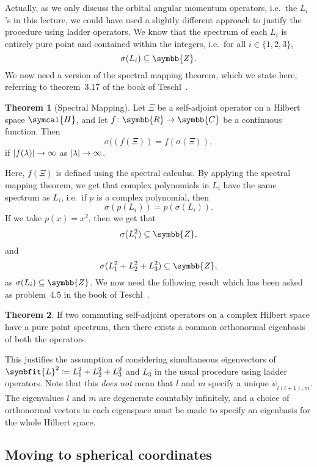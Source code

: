 \documentclass[12pt, a4 paper]{article}
\theoremstyle{definition}
\newtheorem{thm}{Theorem}
\newcommand{\rr}{\symbb{R}}
\newcommand{\cc}{\symbb{C}}
\newcommand{\zz}{\symbb{Z}}
\newcommand{\hilbert}{\symcal{H}}
\newcommand{\spec}{\sigma}
\DeclarePairedDelimiter{\abs}{\lvert}{\rvert}
\begin{document}
    Actually, as we only discuss the orbital angular momentum operators, i.e.\ the \(L_i\)'s in this lecture, we could have used a slightly different approach to justify the procedure using ladder operators. We know that the spectrum of each \(L_i\) is entirely pure point and contained within the integers, i.e.\ for all \(i \in \{1, 2, 3\}\),
    \[
        \spec(L_i) \subseteq \zz.
    \]
    We now need a version of the spectral mapping theorem, which we state here, referring to theorem~3.17 of the book of Teschl~\cite[p.~118]{Teschl}.
    \begin{thm}[Spectral Mapping]
        Let \(\Xi\) be a self-adjoint operator on a Hilbert space \(\hilbert\), and let \(f \colon \rr \rightarrow \cc\) be a continuous function. Then
        \[
            \spec((f(\Xi)) = f(\spec(\Xi)),
        \]
        if \(\abs{f(\lambda)} \rightarrow \infty\) as \(\abs{\lambda} \rightarrow \infty\).
    \end{thm}
    Here, \(f(\Xi)\) is defined using the spectral calculus. By applying the spectral mapping theorem, we get that complex polynomials in \(L_i\) have the same spectrum as \(L_i\), i.e.\ if \(p\) is a complex polynomial, then
    \[
        \spec(p(L_i)) = p(\spec(L_i)).
    \]
    If we take \(p(x) = x^2\), then we get that \[\spec(L_i^2) \subseteq \zz,\] and \[\spec(L_1^2 + L_2^2 + L_3^2) \subseteq \zz,\] as \(\spec(L_i) \subseteq \zz\). We now need the following result which has been asked as problem~4.5 in the book of Teschl~\cite[p.~138]{Teschl}.
    \begin{thm}
        If two commuting self-adjoint operators on a complex Hilbert space have a pure point spectrum, then there exists a common orthonormal eigenbasis of both the operators.
    \end{thm}
    This justifies the assumption of considering simultaneous eigenvectors of \(\symbfit{L}^2 \coloneq L_1^2 + L_2^2 + L_3^2\) and \(L_3\) in the usual procedure using ladder operators. Note that this \textit{does not} mean that \(l\) and \(m\) specify a unique \(\psi_{l(l+1), m}\). The eigenvalues \(l\) and \(m\) are degenerate countably infinitely, and a choice of orthonormal vectors in each eigenspace must be made to specify an eigenbasis for the whole Hilbert space.

    \subsection{Moving to spherical coordinates}
\end{document}
